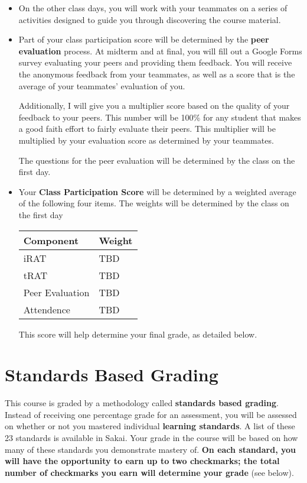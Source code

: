 {\begin{itemize}
    \item On the other class days, you will work with your teammates on a series of activities designed to guide you through discovering the course material.

    \item Part of your class participation score will be determined by the {\bf peer evaluation} process.  At midterm and at final, you will fill out a Google Forms survey evaluating your peers and providing them feedback.  You will receive the anonymous feedback from your teammates, as well as a score that is the average of your teammates' evaluation of you.

    Additionally, I will give you a multiplier score based on the quality of your feedback to your peers.  This number will be 100\% for any student that makes a good faith effort to fairly evaluate their peers.  This multiplier will be multiplied by your evaluation score as determined by your teammates.

    The questions for the peer evaluation will be determined by the class on the first day.

    \item Your {\bf Class Participation Score} will be determined by a weighted average of the following four items.  The weights will be determined by the class on the first day

    \begin{center}
    \begin{tabular}{l|l}
    Component & Weight \\ \hline \hline
    iRAT & TBD \\ \hline
    tRAT & TBD\\ \hline
    Peer Evaluation & TBD \\ \hline
    Attendence & TBD\\ \hline

    \end{tabular}
    \end{center}

    This score will help determine your final grade, as detailed below.
    \end{itemize}
}

\section*{\fontsize{12}{15}\selectfont Standards Based Grading}
This course is graded by a methodology called {\bf standards based grading}.  Instead of receiving one percentage grade for an assessment, you will be assessed on whether or not you mastered individual {\bf learning standards}.  A list of these 23 standards is available in Sakai.  Your grade in the course will be based on how many of these standards you demonstrate mastery of.  {\bf On each standard, you will have the opportunity to earn up to two checkmarks; the total number of checkmarks you earn will determine your grade} (see below).


